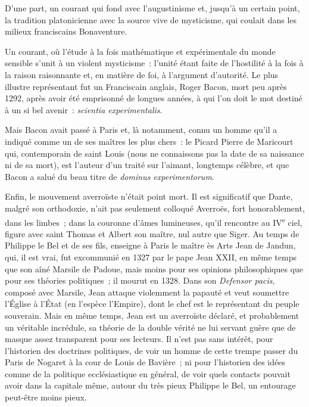 \documentclass[french,twoside]{book} %
\newcommand\foreign[1]{\emph{#1}}
\begin{document}
\begin{listalpha}[itemsep=\baselineskip,]
\item D’une part, un courant qui fond avec l’augustinisme et, jusqu’à un certain point, la tradition platonicienne avec la source vive de mysticisme, qui coulait dans les milieux franciscains Bonaventure.
\item  Un courant, où l’étude à la fois mathématique et expérimentale du monde sensible s’unit à un violent mysticisme : l’unité étant faite de l’hostilité à la fois à la raison raisonnante et, en matière de foi, à l’argument d’autorité. Le plus illustre représentant fut un Franciscain anglais, Roger Bacon, mort peu après 1292, après avoir été emprisonné de longues années, à qui l’on doit le mot destiné à un si bel avenir : \foreign{scientia experimentalis}.\par
 Mais Bacon avait passé à Paris et, là notamment, connu un homme qu’il a indiqué comme un de ses maîtres les plus chers : le Picard Pierre de Maricourt qui, contemporain de saint Louis (nous ne connaissons pas la date de sa naissance ni de sa mort), est l’auteur d’un traité sur l’aimant, longtemps célèbre, et que Bacon a salué du beau titre de \foreign{dominus experimentorum}.
 
\item Enfin, le mouvement averroïste n’était point mort. Il est significatif que Dante, malgré son orthodoxie, n’ait pas seulement colloqué Averroës, fort honorablement, dans les limbes ; dans la couronne d’âmes lumineuses, qu’il rencontre au IV\textsuperscript{e} ciel, figure avec saint Thomas et Albert son maître, nul autre que Siger. Au temps de Philippe le Bel et de ses fils, enseigne à Paris le maître ès Arts Jean de Jandun, qui, il est vrai, fut excommunié en 1327 par le pape Jean XXII, en même temps que son aîné Marsile de Padoue, mais moins pour ses opinions philosophiques que pour ses théories politiques ; il mourut en 1328. Dans son {\itshape Defensor pacis}, composé avec Marsile, Jean attaque violemment la papauté et veut soumettre l’Église à l’État (en l’espèce l’Empire), dont le chef est le représentant du peuple souverain. Mais en même temps, Jean est un averroïste déclaré, et probablement un véritable incrédule, sa théorie de la double vérité ne lui servant guère que de masque assez transparent pour ses lecteurs. Il n’est pas sans intérêt, pour l’historien des doctrines politiques, de voir un homme de cette trempe passer du Paris de Nogaret à la cour de Louis de Bavière ; ni pour l’historien des idées comme de la politique ecclésiastique en général, de voir quels contacts pouvait avoir dans la capitale même, autour du très pieux Philippe le Bel, un entourage peut-être moins pieux.
\end{listalpha}
\end{document}
